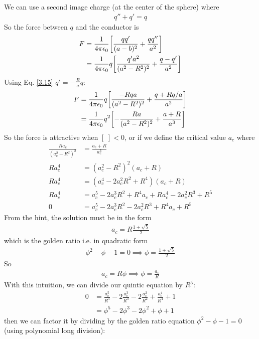 \documentclass[../main.tex]{subfiles}
\begin{document}
We can use a second image charge (at the center of the sphere) where
\begin{align*}
    q'' + q' = q
\end{align*}
So the force between $q$ and the conductor is
\begin{align*}
    F &= \ke \qt[
        \frac{qq'}{(a - b)^2} + \frac{qq''}{a^2}
    ] \\
    &= \ke q \qt[
        \frac{q' a^2}{(a^2 - R^2)^2} + \frac{q - q'}{a^2}
    ]
\end{align*}
Using Eq. \eqref{3.15} $q' = -\frac{R}{a} q$:
\begin{align*}
    F &= \ke q \qt[
        \frac{-Rq a}{(a^2 - R^2)^2} + \frac{q + Rq / a}{a^2}
    ] \\
    &= \ke q^2 \qt[
        -\frac{Ra}{(a^2 - R^2)^2} + \frac{a + R}{a^3}
    ]
\end{align*}
So the force is attractive when $[\;] < 0$, or if we define the critical value $a_c$ where
\begin{align*}
    \frac{Ra_c}{(a_c^2 - R^2)^2} &= \frac{a_c + R}{a_c^3} \\
    Ra_c^4 &= (a_c^2 - R^2)^2 (a_c + R) \\
    Ra_c^4 &= (a_c^4 - 2a_c^2 R^2 + R^4) (a_c + R) \\
    Ra_c^4 &= a_c^5 - 2a_c^3 R^2 + R^4 a_c + R a_c^4 - 2a_c^2 R^3 + R^5 \\
    0 &= a_c^5 - 2a_c^3 R^2 - 2a_c^2 R^3 + R^4 a_c + R^5
\end{align*}
From the hint, the solution must be in the form
\begin{align*}
    a_c = R \frac{1 + \sqrt{5}}{2}
\end{align*}
which is the golden ratio i.e. in quadratic form
\begin{align*}
    \phi^2 - \phi - 1 = 0 \implies \phi = \frac{1 + \sqrt{5}}{2}
\end{align*}
So
\begin{align*}
    a_c = R \phi \implies \phi = \frac{a_c}{R}
\end{align*}
With this intuition, we can divide our quintic equation by $R^5$:
\begin{align*}
    0 &= \frac{a_c^5}{R^5} - 2\frac{a_c^3}{R^3} - 2\frac{a_c^2}{R^2} + \frac{a_c^4}{R^4} + 1 \\
    &= \phi^5 - 2\phi^3  - 2\phi^2 + \phi + 1
\end{align*}
then we can factor it by dividing by the golden ratio equation $\phi^2 - \phi - 1 = 0$ (using polynomial long division):
\end{document}
